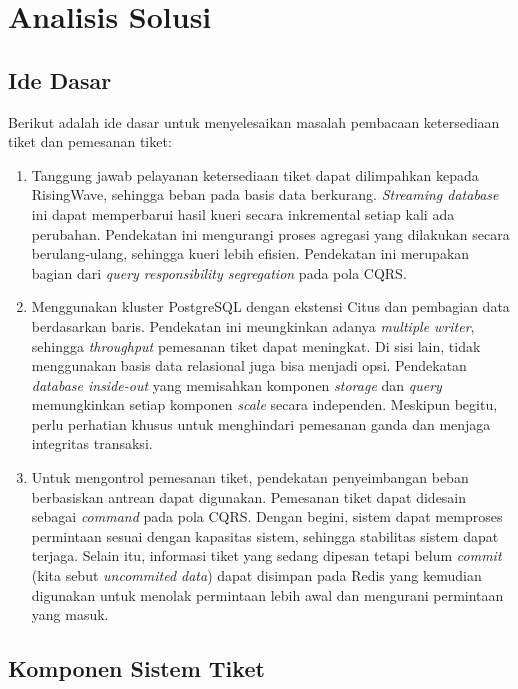 \section{Analisis Solusi}

\subsection{Ide Dasar}

Berikut adalah ide dasar untuk menyelesaikan masalah pembacaan ketersediaan tiket dan pemesanan tiket:

\begin{enumerate}
  \item Tanggung jawab pelayanan ketersediaan tiket dapat dilimpahkan kepada RisingWave, sehingga beban pada basis data berkurang. \textit{Streaming database} ini dapat memperbarui hasil kueri secara inkremental setiap kali ada perubahan. Pendekatan ini mengurangi proses agregasi yang dilakukan secara berulang-ulang, sehingga kueri lebih efisien. Pendekatan ini merupakan bagian dari \textit{query responsibility segregation} pada pola CQRS.
  \item Menggunakan kluster PostgreSQL dengan ekstensi Citus dan pembagian data berdasarkan baris. Pendekatan ini meungkinkan adanya \textit{multiple writer}, sehingga \textit{throughput} pemesanan tiket dapat meningkat. Di sisi lain, tidak menggunakan basis data relasional juga bisa menjadi opsi. Pendekatan \textit{database inside-out} yang memisahkan komponen \textit{storage} dan \textit{query} memungkinkan setiap komponen \textit{scale} secara independen. Meskipun begitu, perlu perhatian khusus untuk menghindari pemesanan ganda dan menjaga integritas transaksi.
  \item Untuk mengontrol pemesanan tiket, pendekatan penyeimbangan beban berbasiskan antrean dapat digunakan. Pemesanan tiket dapat didesain sebagai \textit{command} pada pola CQRS. Dengan begini, sistem dapat memproses permintaan sesuai dengan kapasitas sistem, sehingga stabilitas sistem dapat terjaga. Selain itu, informasi tiket yang sedang dipesan tetapi belum \textit{commit} (kita sebut \textit{uncommited data}) dapat disimpan pada Redis yang kemudian digunakan untuk menolak permintaan lebih awal dan mengurani permintaan yang masuk.
\end{enumerate}

\subsection{Komponen Sistem Tiket}

